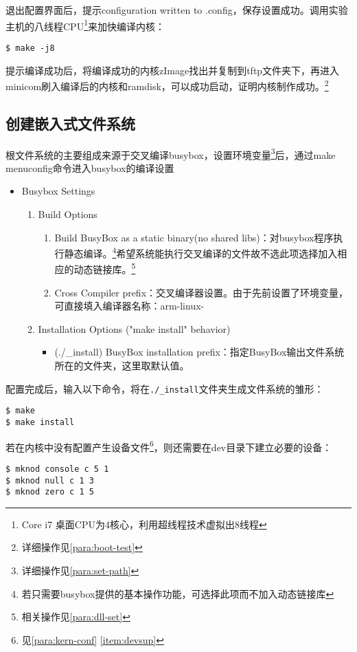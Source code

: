 \documentclass[hyperref,UTF8]{ctexart}
\begin{document}
退出配置界面后，提示configuration written to .config，保存设置成功。调用实验主机的八线程CPU\footnote{Core i7 桌面CPU为4核心，利用超线程技术虚拟出8线程}来加快编译内核：
\begin{Verbatim}[frame=single]
$ make -j8
\end{Verbatim}

提示编译成功后，将编译成功的内核zImage找出并复制到tftp文件夹下，再进入minicom刷入编译后的内核和ramdisk，可以成功启动，证明内核制作成功。\footnote{详细操作见\ref{para:boot-test}}

\subsection{创建嵌入式文件系统}\label{subsec:crt-fs}
根文件系统的主要组成来源于交叉编译busybox，设置环境变量\footnote{详细操作见\ref{para:set-path}}后，通过make menuconfig命令进入busybox的编译设置
\begin{itemize}
    \item Busybox Settings
    \begin{enumerate}
        \item Build Options
        \begin{enumerate}
            \item Build BusyBox as a static binary(no shared libs)：对busybox程序执行静态编译。\footnote{若只需要busybox提供的基本操作功能，可选择此项而不加入动态链接库}希望系统能执行交叉编译的文件故不选此项选择加入相应的动态链接库。\footnote{相关操作见\ref{para:dll-set}}
            \item Cross Compiler prefix：交叉编译器设置。由于先前设置了环境变量，可直接填入编译器名称：arm-linux-
        \end{enumerate}
        \item Installation Options ("make install" behavior)
        \begin{itemize}
            \item (./\_install) BusyBox installation prefix：指定BusyBox输出文件系统所在的文件夹，这里取默认值。
        \end{itemize}
    \end{enumerate}
\end{itemize}

配置完成后，输入以下命令，将在{\verb"./_install"}文件夹生成文件系统的雏形：
\begin{Verbatim}[frame=single]
$ make
$ make install
\end{Verbatim}

若在内核中没有配置产生设备文件\footnote{见\ref{para:kern-conf} \ref{item:devsup}}，则还需要在dev目录下建立必要的设备：
\begin{Verbatim}[frame=single]
$ mknod console c 5 1
$ mknod null c 1 3
$ mknod zero c 1 5
\end{Verbatim}
\end{document}
